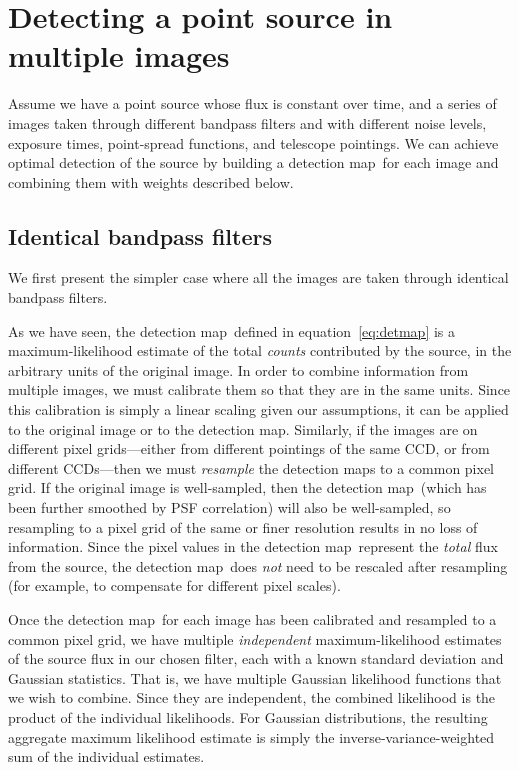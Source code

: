 \documentclass[letterpaper,preprint]{aastex}
\newcommand{\equationname}{equation}
\newcommand{\eqnref}[1]{\mbox{\equationname~\ref{#1}}}
\newcommand{\detmap}{detection map}
\begin{document}
\section{Detecting a point source in multiple images}

Assume we have a point source whose flux is constant over time, and a
series of images taken through different bandpass filters and with
different noise levels, exposure times, point-spread functions, and
telescope pointings.  We can achieve optimal detection of the source
by building a \detmap\ for each image and combining them with weights
described below.


\subsection{Identical bandpass filters}

We first present the simpler case where all the images are taken
through identical bandpass filters.

As we have seen, the \detmap\ defined in \eqnref{eq:detmap} is a
maximum-likelihood estimate of the total \emph{counts} contributed by
the source, in the arbitrary units of the original image.  In order to
combine information from multiple images, we must calibrate them so
that they are in the same units.  Since this calibration is simply a
linear scaling given our assumptions,
it can be applied to the original image or to the
\detmap.  Similarly, if the images are on different pixel
grids---either from different pointings of the same CCD, or from
different CCDs---then we must \emph{resample} the \detmap s to a
common pixel grid.
%
If the original image is well-sampled, then the \detmap\ (which has
been further smoothed by PSF correlation) will also be well-sampled,
so resampling to a pixel grid of the same or finer resolution results
in no loss of information.
%
Since the pixel values in the \detmap\ represent the \emph{total} flux
from the source, the \detmap\ does \emph{not} need to be rescaled after
resampling (for example, to compensate for different pixel scales).


Once the \detmap\ for each image has been calibrated and resampled to
a common pixel grid, we have multiple \emph{independent}
maximum-likelihood estimates of the source flux in our chosen filter,
each with a known standard deviation and Gaussian statistics.  That
is, we have multiple Gaussian likelihood functions that we wish to
combine.  Since they are independent, the combined likelihood is the
product of the individual likelihoods.  For Gaussian distributions,
the resulting aggregate maximum likelihood estimate is simply the
inverse-variance-weighted sum of the individual estimates.
\end{document}
